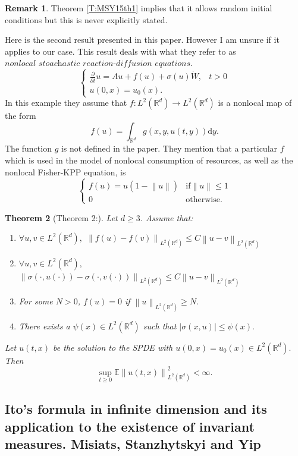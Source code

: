 \documentclass[a4paper,11pt]{article}%
\numberwithin{equation}{section}
\theoremstyle{plain}
\newtheorem{theorem}{Theorem}[section]
\theoremstyle{definition}
\newtheorem{remark}[theorem]{Remark}
\newcommand{\R}{\mathbb{R}}
\newcommand{\Norm}[1]{\left\|  #1   \right\|}
\newcommand{\ud}{\ensuremath{ \mathrm{d} }}
\begin{document}
\begin{remark}
	Theorem \ref{T:MSY15th1} implies that it allows random initial conditions but this is never explicitly stated.
\end{remark}

Here is the second result presented in this paper. However I am unsure if it applies to our case. This result deals with what they refer to as $\textit{nonlocal stoachastic reaction-diffusion equations.}$
	\[
		\begin{cases}
			\frac{\partial}{\partial t} u = Au+ f(u)+ \sigma(u) \dot{W}, & t>0
			\\ u(0,x) = u_0(x) .
		\end{cases}
	\]
In this example they assume that $f : L^2(\R^d) \to L^2(\R^d)$ is a nonlocal map of the form
	\[
		f(u) = \int_{\R^d} g(x,y,u(t,y)) \ud y.
	\]
The function $g$ is not defined in the paper. They mention that a particular $f$ which is used in the model of nonlocal consumption of resources, as well as the nonlocal Fisher-KPP equation, is
	\[
		\begin{cases}
		f(u) = u(1-\Norm{u}) & \text{if} \Norm{u} \le 1
		\\ 0 & \text{otherwise}.
		\end{cases}
	\]
	\begin{theorem}[Theorem 2:]
		Let $d \ge 3$. Assume that:
			\begin{enumerate}
				\item $\forall u,v \in L^2(\R^d),$ $\Norm{f(u)-f(v)}_{L^2(\R^d)} \le C\Norm{u-v}_{L^2(\R^d)}$
				\item $\forall u,v \in L^2(\R^d),$ $\Norm{\sigma(\cdot,u(\cdot))-\sigma(\cdot,v(\cdot))}_{L^2(\R^d)} \le C\Norm{u-v}_{L^2(\R^d)}$
				\item For some $N>0$, $f(u)=0$ if $\Norm{u}_{L^2(\R^d)} \ge N.$
				\item There exists a $\psi(x) \in L^2(\R^d)$ such that $|\sigma(x,u)| \le \psi(x).$
			\end{enumerate}
		Let $u(t,x)$ be the solution to the SPDE with $u(0,x) = u_0(x) \in L^2(\R^d).$ Then
			\[
				\sup_{t\ge 0}\mathbb{E} \Norm{u(t,x)}_{L^2(\R^d)}^2 < \infty.
			\]
	\end{theorem}

\subsection{Ito's formula in infinite dimension and its application to the existence of invariant measures. Misiats, Stanzhytskyi and Yip \cite{MSY16}}
\end{document}
